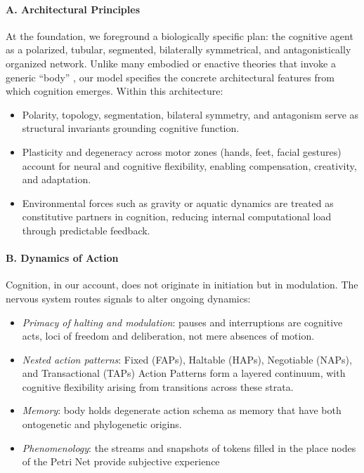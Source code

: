 \paragraph{A. Architectural Principles}
At the foundation, we foreground a biologically specific plan: the cognitive agent as a polarized, tubular, segmented, bilaterally symmetrical, and antagonistically organized network. Unlike many embodied or enactive theories that invoke a generic ``body'' \citep{clark1997being, gallagher2005how}, our model specifies the concrete architectural features from which cognition emerges. Within this architecture:
\begin{itemize}
    \item Polarity, topology, segmentation, bilateral symmetry, and antagonism serve as structural invariants grounding cognitive function.
    \item Plasticity and degeneracy across motor zones (hands, feet, facial gestures) account for neural and cognitive flexibility, enabling compensation, creativity, and adaptation.
    \item Environmental forces such as gravity or aquatic dynamics are treated as constitutive partners in cognition, reducing internal computational load through predictable feedback.
\end{itemize}

\paragraph{B. Dynamics of Action}
Cognition, in our account, does not originate in initiation but in modulation. The nervous system routes signals to alter ongoing dynamics:
\begin{itemize}
    \item \emph{Primacy of halting and modulation}: pauses and interruptions are cognitive acts, loci of freedom and deliberation, not mere absences of motion.
    \item \emph{Nested action patterns}: Fixed (FAPs), Haltable (HAPs), Negotiable (NAPs), and Transactional (TAPs) Action Patterns form a layered continuum, with cognitive flexibility arising from transitions across these strata.
    \item \emph{Memory}: body holds degenerate action schema as memory that have both ontogenetic and phylogenetic origins.
    \item \emph{Phenomenology}: the streams and snapshots of tokens filled in the place nodes of the Petri Net provide subjective experience
\end{itemize}

